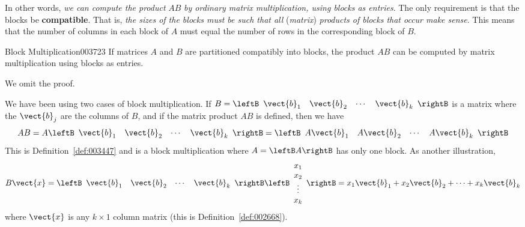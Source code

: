 In other words, \textit{we can compute the product} $AB$ \textit{by ordinary matrix multiplication, using blocks as entries}. The only requirement is that the blocks be \textbf{compatible}. That is, \textit{the sizes of the blocks must be such that all} (\textit{matrix}) \textit{products of blocks that occur make sense}. This means that the number of columns in each block of $A$ must equal the number of rows in the corresponding block of $B$.


\begin{theorem}{Block Multiplication}{003723}
If matrices $A$ and $B$ are partitioned compatibly into blocks, the product $AB$ can be computed by matrix multiplication using blocks as entries.
\end{theorem}

\noindent We omit the proof.

We have been using two cases of block multiplication. If $B = \leftB \begin{array}{cccc}
\vect{b}_{1} & \vect{b}_{2} & \cdots & \vect{b}_{k}
\end{array} \rightB$ is a matrix where the $\vect{b}_{j}$ are the columns of $B$, and if the matrix product $AB$ is defined, then we have
\begin{equation*}
AB = A \leftB \begin{array}{rrrr}
\vect{b}_{1} & \vect{b}_{2} & \cdots & \vect{b}_{k}
\end{array} \rightB = \leftB \begin{array}{rrrr}
A\vect{b}_{1} & A\vect{b}_{2} & \cdots & A\vect{b}_{k}
\end{array} \rightB
\end{equation*}
This is Definition~\ref{def:003447} and is a block multiplication where $A = \leftB A \rightB$ has only one block. As another illustration,
\begin{equation*}
B\vect{x} = \leftB \begin{array}{rrrr}
\vect{b}_{1} & \vect{b}_{2} & \cdots & \vect{b}_{k}
\end{array} \rightB \leftB \begin{array}{c}
x_{1} \\
x_{2} \\
\vdots \\
x_{k}
\end{array} \rightB = x_{1}\vect{b}_{1} + x_{2}\vect{b}_{2} + \cdots + x_{k}\vect{b}_{k}
\end{equation*}
where $\vect{x}$ is any $k \times 1$ column matrix (this is Definition~\ref{def:002668}).


